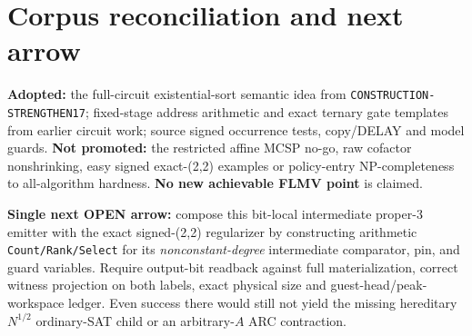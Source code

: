\documentclass[11pt]{article}
\begin{document}
\section{Corpus reconciliation and next arrow}
\textbf{Adopted:} the full-circuit existential-sort semantic idea from
\texttt{CONSTRUCTION-STRENGTHEN17}; fixed-stage address arithmetic and
exact ternary gate templates from earlier circuit work; source signed
occurrence tests, copy/DELAY and model guards. \textbf{Not promoted:}
the restricted affine MCSP no-go, raw cofactor nonshrinking, easy signed
exact-(2,2) examples or policy-entry NP-completeness to all-algorithm
hardness. \textbf{No new achievable FLMV point} is claimed.

\noindent \textbf{Single next OPEN arrow:} compose this bit-local intermediate
proper-3 emitter with the exact signed-(2,2) regularizer by constructing
arithmetic \texttt{Count/Rank/Select} for its \emph{nonconstant-degree}
intermediate comparator, pin, and guard variables. Require output-bit
readback against full materialization, correct witness projection on both
labels, exact physical size and guest-head/peak-workspace ledger. Even
success there would still not yield the missing hereditary
$N^{1/2}$ ordinary-SAT child or an arbitrary-$A$ ARC contraction.


\end{document}

